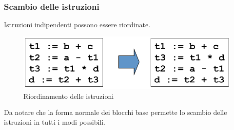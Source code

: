 \subsubsection{Scambio delle istruzioni}
\label{sec:interchange_statements}
Istruzioni indipendenti possono essere riordinate.
\begin{figure}[H]
  \centering
  \includegraphics[scale=0.4]{res/image/interchange_statement}
  \caption{Riordinamento delle istruzioni}
  \label{img:interchange_statement}
\end{figure}

Da notare che la forma normale dei blocchi base permette lo scambio delle
istruzioni in tutti i modi possibili.
